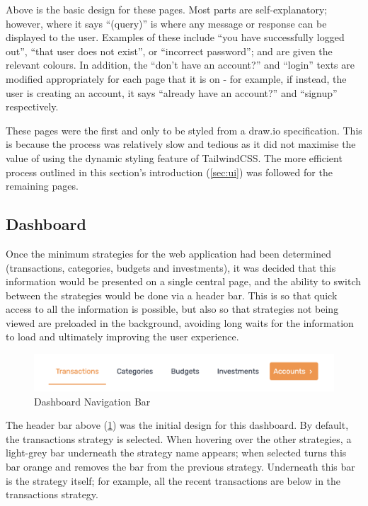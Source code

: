 \vspace{\baselineskip}

Above is the basic design for these pages. Most parts are self-explanatory; however, where it says ``(query)'' is where any message or response can be displayed to the user. Examples of these include ``you have successfully logged out'', ``that user does not exist'', or ``incorrect password''; and are given the relevant colours. In addition, the ``don't have an account?'' and ``login'' texts are modified appropriately for each page that it is on - for example, if instead, the user is creating an account, it says ``already have an account?'' and ``signup'' respectively.

These pages were the first and only to be styled from a draw.io specification. This is because the process was relatively slow and tedious as it did not maximise the value of using the dynamic styling feature of TailwindCSS. The more efficient process outlined in this section's introduction (\ref{sec:ui}) was followed for the remaining pages.

\subsection{Dashboard}
Once the minimum strategies for the web application had been determined (transactions, categories, budgets and investments), it was decided that this information would be presented on a single central page, and the ability to switch between the strategies would be done via a header bar. This is so that quick access to all the information is possible, but also so that strategies not being viewed are preloaded in the background, avoiding long waits for the information to load and ultimately improving the user experience.

\begin{figure}[H]
	\centering
	\includegraphics[width=\textwidth]{images/header_navigation_bar.png}
	\caption{Dashboard Navigation Bar}
	\label{fig:DashboardNavigationBar}
\end{figure}

The header bar above (\ref{fig:DashboardNavigationBar}) was the initial design for this dashboard. By default, the transactions strategy is selected. When hovering over the other strategies, a light-grey bar underneath the strategy name appears; when selected turns this bar orange and removes the bar from the previous strategy. Underneath this bar is the strategy itself; for example, all the recent transactions are below in the transactions strategy.

